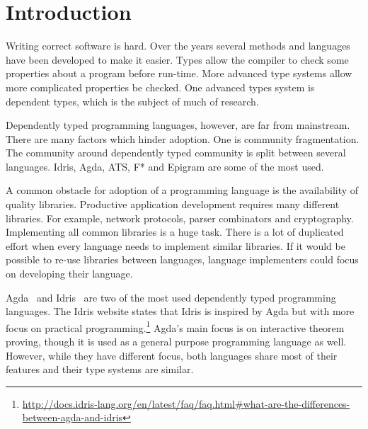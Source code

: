 \chapter{Introduction}

Writing correct software is hard. Over the years several methods and languages
have been developed to make it easier. Types allow the compiler to check some
properties about a program before run-time. More advanced type systems allow
more complicated properties be checked.
One advanced types system is dependent types, which is the subject of much
of research.

Dependently typed programming languages, however, are far from mainstream.
There are many factors which hinder adoption. One is community fragmentation.
The community around dependently typed community is split between several
languages.  Idris, Agda, ATS, F* and Epigram are some of the most used.

A common obstacle for adoption of a programming language is the
availability of quality libraries. Productive application development requires
many different libraries.  For example, network protocols, parser combinators
and cryptography.  Implementing all common libraries is a huge task.  There is
a lot of duplicated effort when every language needs to implement similar
libraries.  If it would be possible to re-use libraries between languages,
language implementers could focus on developing their language.

Agda~\cite{agda} and Idris~\cite{idris} are two of the most used dependently
typed programming languages.
The Idris website states that Idris is inspired
by Agda but with more focus on practical
programming.\footnote{\url{http://docs.idris-lang.org/en/latest/faq/faq.html\#what-are-the-differences-between-agda-and-idris}}
Agda's main focus is on interactive theorem proving, though it is used as
a general purpose programming language as well.  However, while they have
different focus, both languages share most of their features and their type
systems are similar.

